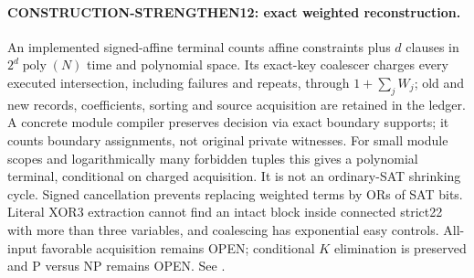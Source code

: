 \paragraph{CONSTRUCTION-STRENGTHEN12: exact weighted reconstruction.}
An implemented signed-affine terminal counts affine constraints plus $d$
clauses in $2^d\operatorname{poly}(N)$ time and polynomial space.
Its exact-key coalescer charges every executed intersection, including
failures and repeats, through $1+\sum_j W_j$; old and new records,
coefficients, sorting and source acquisition are retained in the ledger.
A concrete module compiler preserves decision via exact boundary supports;
it counts boundary assignments, not original private witnesses.
For small module scopes and logarithmically many forbidden tuples this
gives a polynomial terminal, conditional on charged acquisition.
It is not an ordinary-SAT shrinking cycle. Signed cancellation prevents
replacing weighted terms by ORs of SAT bits. Literal XOR3 extraction cannot
find an intact block inside connected strict22 with more than three variables,
and coalescing has exponential easy controls.
All-input favorable acquisition remains OPEN; conditional $K$ elimination
is preserved and P versus NP remains OPEN.
See .


